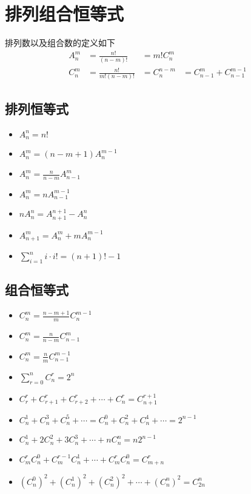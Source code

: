 \section{排列组合恒等式}
排列数以及组合数的定义如下
\[ \begin{aligned}
    A^m_n &= \frac{n!}{(n-m)!} &= m! C^m_n \\
    C^m_n &= \frac{n!}{m!(n-m)!} &= C^{n-m}_{n} &= C^m_{n-1} + C^{m-1}_{n-1}
\end{aligned} \]
\subsection{排列恒等式}
\begin{itemize}
\item $A^n_n = n!$
\item $A^m_n = (n-m+1) A^{m-1}_n$
\item $A^{m}_{n} = \frac{n}{n-m} A^{m}_{n-1}$
\item $A^{m}_{n} = n A^{m-1}_{n-1}$
\item $nA^{n}_{n} = A^{n+1}_{n+1} - A^{n}_{n}$
\item $A^{m}_{n+1} = A^{m}_{n} + mA^{m-1}_{n}$
\item $\sum^n_{i=1} i \cdot i! = (n+1)! - 1$
\end{itemize}

\subsection{组合恒等式}
\begin{itemize}
\item $C^{m}_{n} = \frac{n-m+1}{m} C^{m-1}_{n}$
\item $C^{m}_{n} = \frac{n}{n-m} C^{m}_{n-1}$
\item $C^{m}_{n} = \frac{n}{m} C^{m-1}_{n-1}$
\item $\sum^n_{r=0} C^{r}_{n} = 2^n$
\item $C^{r}_{r} + C^{r}_{r+1} + C^{r}_{r+2} + \cdots + C^{r}_{n} = C^{r+1}_{n+1}$
\item $C^{1}_{n} + C^{3}_{n} + C^{5}_{n} + \cdots = C^{0}_{n} + C^{2}_{n} + C^{4}_{n} + \cdots = 2^{n-1}$
\item $C^{1}_{n} + 2C^{2}_{n} + 3C^{3}_{n} + \cdots + nC^{n}_{n} = n2^{n-1}$
\item $C^{r}_{m}C^{0}_{n} + C^{r-1}_{m}C^{1}_{n} + \cdots + C^{r}_{m}C^{0}_{n} = C^{r}_{m+n}$
\item $(C^{0}_{n})^2 + (C^{1}_{n})^2 + (C^{2}_{n})^2 + \cdots + (C^{n}_{n})^2 = C^{n}_{2n}$
\end{itemize}

